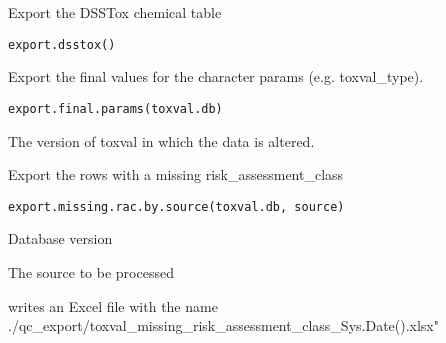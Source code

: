 \documentclass[letterpaper]{book}
\begin{document}
%
\begin{Description}\relax
Export the DSSTox chemical table
\end{Description}
%
\begin{Usage}
\begin{verbatim}
export.dsstox()
\end{verbatim}
\end{Usage}
%
\begin{Description}\relax
Export the final values for the character params (e.g. toxval\_type).
\end{Description}
%
\begin{Usage}
\begin{verbatim}
export.final.params(toxval.db)
\end{verbatim}
\end{Usage}
%
\begin{Arguments}
\begin{ldescription}
\item[\code{toxval.db}] The version of toxval in which the data is altered.
\end{ldescription}
\end{Arguments}
%
\begin{Description}\relax
Export the rows with a missing risk\_assessment\_class
\end{Description}
%
\begin{Usage}
\begin{verbatim}
export.missing.rac.by.source(toxval.db, source)
\end{verbatim}
\end{Usage}
%
\begin{Arguments}
\begin{ldescription}
\item[\code{toxval.db}] Database version

\item[\code{source}] The source to be processed
\end{ldescription}
\end{Arguments}
%
\begin{Value}
writes an Excel file with the name
./qc\_export/toxval\_missing\_risk\_assessment\_class\_Sys.Date().xlsx"
\end{Value}
\end{document}
